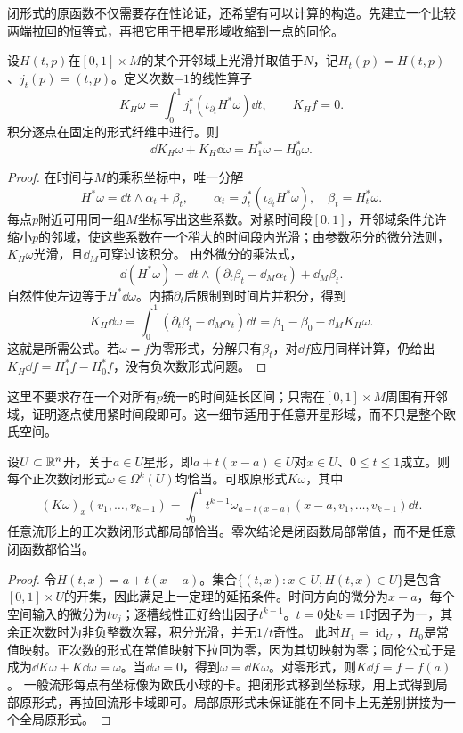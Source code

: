 闭形式的原函数不仅需要存在性论证，还希望有可以计算的构造。先建立一个比较两端拉回的恒等式，再把它用于把星形域收缩到一点的同伦。
\begin{theorem}[同伦算子公式]\label{thm:homotopy-operator}
设$H(t,p)$在$[0,1]\times M$的某个开邻域上光滑并取值于$N$，记$H_t(p)=H(t,p)$、$j_t(p)=(t,p)$。定义次数$-1$的线性算子
\[
 K_H\omega=\int_0^1 j_t^*(\iota_{\partial_t}H^*\omega)\dd t,
 \qquad K_Hf=0.
\]
积分逐点在固定的形式纤维中进行。则
\[
 \dd K_H\omega+K_H\dd\omega=H_1^*\omega-H_0^*\omega.
\]
\end{theorem}
\begin{proof}
在时间与$M$的乘积坐标中，唯一分解
\[
 H^*\omega=\dd t\wedge\alpha_t+\beta_t,
 \qquad \alpha_t=j_t^*(\iota_{\partial_t}H^*\omega),\quad\beta_t=H_t^*\omega.
\]
每点$p$附近可用同一组$M$坐标写出这些系数。对紧时间段$[0,1]$，开邻域条件允许缩小$p$的邻域，使这些系数在一个稍大的时间段内光滑；由参数积分的微分法则，$K_H\omega$光滑，且$\dd_M$可穿过该积分。
由外微分的乘法式，
\[
 \dd(H^*\omega)
 =\dd t\wedge(\partial_t\beta_t-\dd_M\alpha_t)+\dd_M\beta_t.
\]
自然性使左边等于$H^*\dd\omega$。内插$\partial_t$后限制到时间片并积分，得到
\[
 K_H\dd\omega=\int_0^1(\partial_t\beta_t-\dd_M\alpha_t)\dd t
 =\beta_1-\beta_0-\dd_MK_H\omega.
\]
这就是所需公式。若$\omega=f$为零形式，分解只有$\beta_t$，对$\dd f$应用同样计算，仍给出$K_H\dd f=H_1^*f-H_0^*f$，没有负次数形式问题。
\end{proof}
这里不要求存在一个对所有$p$统一的时间延长区间；只需在$[0,1]\times M$周围有开邻域，证明逐点使用紧时间段即可。这一细节适用于任意开星形域，而不只是整个欧氏空间。
\begin{theorem}[星形域上的Poincare引理]\label{thm:poincare}
设$U\subset\mathbb{R}^n$开，关于$a\in U$星形，即$a+t(x-a)\in U$对$x\in U$、$0\leq t\leq1$成立。则每个正次数闭形式$\omega\in\Omega^k(U)$均恰当。可取原形式$K\omega$，其中
\[
 (K\omega)_x(v_1,\ldots,v_{k-1})
 =\int_0^1t^{k-1}\omega_{a+t(x-a)}(x-a,v_1,\ldots,v_{k-1})\dd t.
\]
任意流形上的正次数闭形式都局部恰当。零次结论是闭函数局部常值，而不是任意闭函数都恰当。
\end{theorem}
\begin{proof}
令$H(t,x)=a+t(x-a)$。集合$\{(t,x):x\in U,H(t,x)\in U\}$是包含$[0,1]\times U$的开集，因此满足上一定理的延拓条件。时间方向的微分为$x-a$，每个空间输入的微分为$tv_j$；逐槽线性正好给出因子$t^{k-1}$。$t=0$处$k=1$时因子为一，其余正次数时为非负整数次幂，积分光滑，并无$1/t$奇性。
此时$H_1=\operatorname{id}_U$，$H_0$是常值映射。正次数的形式在常值映射下拉回为零，因为其切映射为零；同伦公式于是成为$\dd K\omega+K\dd\omega=\omega$。当$\dd\omega=0$，得到$\omega=\dd K\omega$。对零形式，则$K\dd f=f-f(a)$。
一般流形每点有坐标像为欧氏小球的卡。把闭形式移到坐标球，用上式得到局部原形式，再拉回流形卡域即可。局部原形式未保证能在不同卡上无差别拼接为一个全局原形式。
\end{proof}

